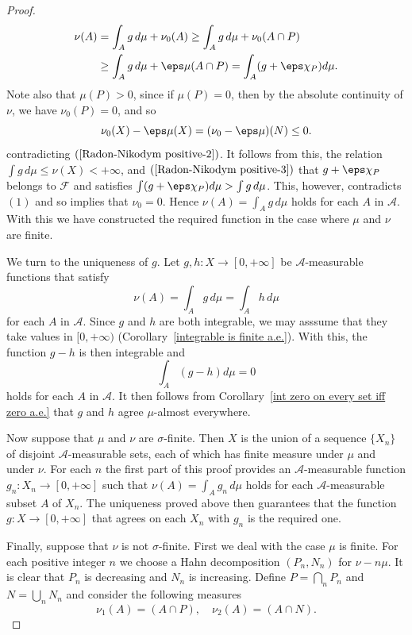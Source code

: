\begin{proof}
\begin{equation}
\begin{aligned}
\nu(A)&=\int_Ag\,d\mu+\nu_0(A)\geq\int_Ag\,d\mu+\nu_0(A\cap P)\\
&\geq\int_Ag\,d\mu+\eps\mu(A\cap P)=\int_A(g+\eps\chi_P)d\mu.
\end{aligned}
\end{equation}
Note also that $\mu(P)>0$, since if $\mu(P)=0$, then by the absolute continuity of $\nu$, we have $\nu_0(P)=0$, and so
\[\nu_0(X)-\eps\mu(X)=(\nu_0-\eps\mu)(N)\leq 0.\]
contradicting $(\ref{Radon-Nikodym positive-2})$. It follows from this, the relation $\int g\,d\mu\leq\nu(X)<+\infty$, and $(\ref{Radon-Nikodym positive-3})$ that $g+\eps\chi_P$ belongs to $\mathscr{F}$ and satisfies $\int(g+\eps\chi_P)d\mu>\int g\,d\mu$. This, however, contradicts $(1)$ and so implies that $\nu_0=0$. Hence $\nu(A)=\int_Ag\,d\mu$ holds for each $A$ in $\mathcal{A}$. With this we have constructed the required function in the case where $\mu$ and $\nu$ are finite.\par
We turn to the uniqueness of $g$. Let $g,h:X\to[0,+\infty]$ be $\mathcal{A}$-measurable functions that satisfy
\[\nu(A)=\int_Ag\,d\mu=\int_Ah\,d\mu\]
for each $A$ in $\mathcal{A}$. Since $g$ and $h$ are both integrable, we may asssume that they take values in $[0,+\infty)$ (Corollary~\ref{integrable is finite a.e.}). With this, the function $g-h$ is then integrable and
\[\int_A(g-h)d\mu=0\]
holds for each $A$ in $\mathcal{A}$. It then follows from Corollary~\ref{int zero on every set iff zero a.e.} that $g$ and $h$ agree $\mu$-almost everywhere.\par
Now suppose that $\mu$ and $\nu$ are $\sigma$-finite. Then $X$ is the union of a sequence $\{X_n\}$ of disjoint $\mathcal{A}$-measurable sets, each of which has finite measure under $\mu$ and under $\nu$. For each $n$ the first part of this proof provides an $\mathcal{A}$-measurable function $g_n:X_n\to[0,+\infty]$ such that $\nu(A)=\int_Ag_n\,d\mu$ holds for each $\mathcal{A}$-measurable subset $A$ of $X_n$. The uniqueness proved above then guarantees that the function $g:X\to[0,+\infty]$ that agrees on each $X_n$ with $g_n$ is the required one.\par
Finally, suppose that $\nu$ is not $\sigma$-finite. First we deal with the case $\mu$ is finite. For each positive integer $n$ we choose a Hahn decomposition $(P_n,N_n)$ for $\nu-n\mu$. It is clear that $P_n$ is decreasing and $N_n$ is increasing. Define $P=\bigcap_nP_n$ and $N=\bigcup_nN_n$ and consider the following measures 
\[\nu_1(A)=(A\cap P),\quad\nu_2(A)=(A\cap N).\]

\end{proof}
